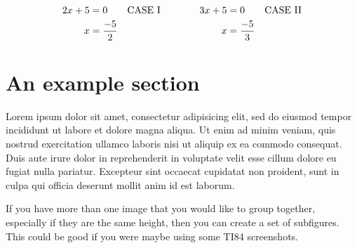\documentclass[a4paper, openany, 12pt]{maatext}
\numberwithin{section}{chapter}
\numberwithin{equation}{chapter}
\begin{document}
\begin{equation*}
\begin{aligned}
2x + 5 &= 0 && \text{CASE I} \\
x &= \dfrac{- 5}{2} 
\end{aligned}
\qquad \qquad
\begin{aligned}
3x + 5 &= 0 && \text{CASE II} \\
x &= \dfrac{- 5}{3} 
\end{aligned}
\end{equation*}

\section{An example section}

Lorem ipsum dolor sit amet, consectetur adipisicing elit, sed do eiusmod tempor incididunt ut labore et dolore magna aliqua. Ut enim ad minim veniam, quis nostrud exercitation ullamco laboris nisi ut aliquip ex ea commodo consequat. Duis aute irure dolor in reprehenderit in voluptate velit esse cillum dolore eu fugiat nulla pariatur. Excepteur sint occaecat cupidatat non proident, sunt in culpa qui officia deserunt mollit anim id est laborum. \cite{Eigen1971}

If you have more than one image that you would like to group together, especially if they are the same height, then you can create a set of subfigures.  This could be good if you were maybe using some TI84 screenshots.
\end{document}
